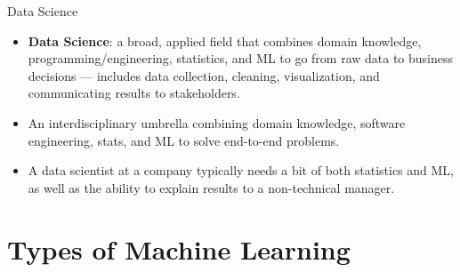 \begin{frame}{Data Science}
	\begin{itemize}
		\item \textbf{Data Science}: a broad, applied field that combines domain knowledge, programming/engineering, statistics, and ML to go from raw data to business decisions --- includes data collection, cleaning, visualization, and communicating results to stakeholders.
		\item An interdisciplinary umbrella combining domain knowledge, software engineering, stats, and ML to solve end-to-end problems.
		\item A data scientist at a company typically needs a bit of both statistics and ML, as well as the ability to explain results to a non-technical manager.
	\end{itemize}
\end{frame}


\begin{frame}%
	\begin{center}
    \end{center}
\end{frame}


\section{Types of Machine Learning}


